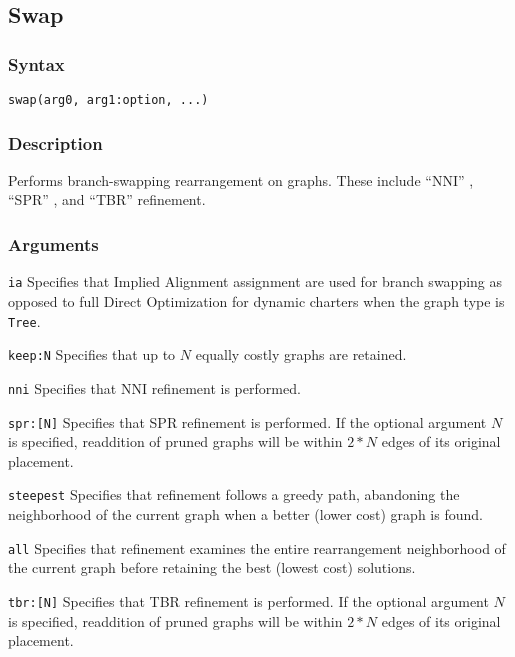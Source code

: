 \documentclass[11pt]{article}
\begin{document}
	\subsection{Swap} 
		\subsubsection{Syntax}
			\texttt{swap(arg0, arg1:option, ...)}
			
		\subsubsection{Description}
		Performs branch-swapping rearrangement on graphs.  These include ``NNI'' \citep{CaminandSokal1965, Robinson1971}, ``SPR''  \citep{Dayhoff1969}, and ``TBR''  \citep{Farris1988, swofford1990a}  refinement.
		
		\subsubsection{Arguments}
		\noindent \texttt{ia} Specifies that Implied Alignment \citep{Wheeler2003} assignment are used for branch swapping as opposed to full Direct Optimization for dynamic charters
		when the graph type is \texttt{Tree}.
		
		\smallskip		
		\noindent \texttt{keep:N} Specifies that up to $N$ equally costly graphs are retained.
		
		\smallskip		
		\noindent \texttt{nni} Specifies that NNI refinement \citep{CaminandSokal1965, Robinson1971} is performed.
		
		\noindent \texttt{spr:[N]} Specifies that SPR refinement \citep{Dayhoff1969} is performed.  If the optional argument $N$ is specified, readdition of pruned graphs will
		be within $2 * N$ edges of its original placement.
		
		\smallskip		
		\noindent \texttt{steepest} Specifies that refinement follows a greedy path, abandoning the neighborhood of the current graph when a better (lower cost)
		graph is found.
		
		\smallskip		
		\noindent \texttt{all} Specifies that refinement examines the entire rearrangement neighborhood of the current graph before retaining the best (lowest cost) solutions.
		
		
		\smallskip		
		\noindent \texttt{tbr:[N]} Specifies that TBR refinement \citep{Farris1988, swofford1990a} is performed.  If the optional argument $N$ is specified, readdition of pruned graphs will
		be within $2 * N$ edges of its original placement.
		
\end{document}
